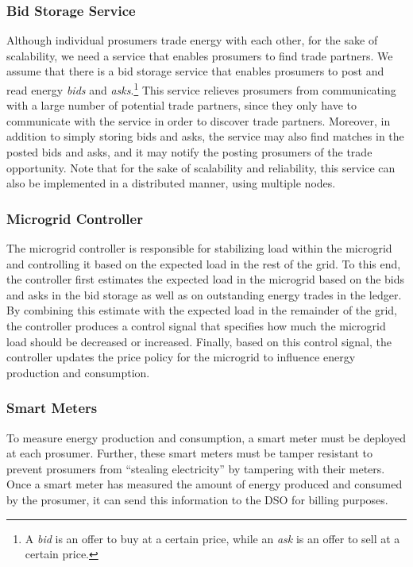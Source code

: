 \subsubsection{Bid Storage Service}
Although individual prosumers trade energy with each other, for the sake of scalability, we need a service that enables prosumers to find trade partners.
We assume that there is a bid storage service that enables prosumers to post and read energy \emph{bids} and \emph{asks}.\footnote{A \emph{bid} is an offer to buy at a certain price, while an \emph{ask} is an offer to sell at a certain price.}  
This service relieves prosumers from communicating with a large number of potential trade partners, since they only have to communicate with the service in order to discover trade partners.
Moreover, in addition to simply storing bids and asks, the service may also find matches in the posted bids and asks, and it may notify the posting prosumers of the trade opportunity.
Note that
for the sake of scalability and reliability, this service can also be implemented in a distributed manner, using multiple nodes.

\subsubsection{Microgrid Controller}
The microgrid controller is responsible for stabilizing load within the microgrid and controlling it based on the expected load in the rest of the grid.
To this end, the controller first estimates the expected load in the microgrid based on the bids and asks in the bid storage as well as on outstanding energy trades in the ledger.
By combining this estimate with the expected load in the remainder of the grid, the controller produces a control signal that specifies how much the microgrid load should be decreased or increased.
Finally, based on this control signal, the controller updates the price policy for the microgrid to influence energy production and consumption.

\subsubsection{Smart Meters}
To measure energy production and consumption, a smart meter must be deployed at each prosumer.
Further, these smart meters must be tamper resistant to prevent prosumers from ``stealing electricity'' by tampering with their meters.
Once a smart meter has measured the amount of energy produced and consumed by the prosumer, it can send this information to the DSO for billing purposes.

